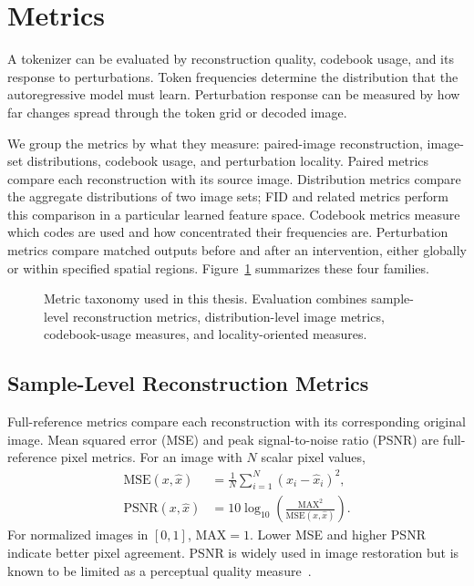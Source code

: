 \section{Metrics}
\label{sec:metrics}

A tokenizer can be evaluated by reconstruction quality, codebook usage, and its
response to perturbations. Token frequencies determine the distribution that
the autoregressive model must learn. Perturbation response can be measured by
how far changes spread through the token grid or decoded image.

We group the metrics by what they measure: paired-image reconstruction,
image-set distributions, codebook usage, and perturbation locality. Paired
metrics compare each reconstruction with its source image. Distribution metrics
compare the aggregate distributions of two image sets; FID and related metrics
perform this comparison in a particular learned feature space. Codebook metrics
measure which codes are used and how concentrated their frequencies are.
Perturbation metrics compare matched outputs before and after an intervention,
either globally or within specified spatial regions. Figure~\ref{fig:metric_taxonomy_matrix}
summarizes these four families.

\begin{figure}[t]
    \centering
    
    \caption{Metric taxonomy used in this thesis. Evaluation combines sample-level reconstruction metrics, distribution-level image metrics, codebook-usage measures, and locality-oriented measures.}
    \label{fig:metric_taxonomy_matrix}
\end{figure}

\subsection{Sample-Level Reconstruction Metrics}
\label{subsec:sample_reconstruction_metrics}

Full-reference metrics compare each reconstruction with its corresponding
original image. Mean squared error (MSE) and peak signal-to-noise ratio (PSNR)
are full-reference pixel metrics. For an image with $N$ scalar pixel values,
\begin{align}
    \mathrm{MSE}(x,\hat{x}) &= \frac{1}{N}\sum_{i=1}^{N}(x_i-\hat{x}_i)^2, \\
    \mathrm{PSNR}(x,\hat{x}) &= 10\log_{10}\!\left(\frac{\mathrm{MAX}^2}{\mathrm{MSE}(x,\hat{x})}\right).
\end{align}
For normalized images in $[0,1]$, $\mathrm{MAX}=1$. Lower MSE and higher PSNR indicate better pixel agreement. PSNR is widely used in image restoration but is known to be limited as a perceptual quality measure~\cite{huynh2008scope}.

